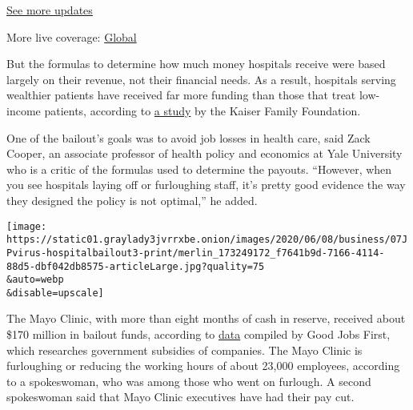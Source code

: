 \href{https://www.nytimes3xbfgragh.onion/live/2020/08/03/business/stock-market-today-coronavirus?action=click\&pgtype=Article\&state=default\&region=MAIN_CONTENT_1\&context=storylines_live_updates}{See
more updates}

More live coverage:
\href{https://www.nytimes3xbfgragh.onion/2020/08/03/world/coronavirus-covid-19.html?action=click\&pgtype=Article\&state=default\&region=MAIN_CONTENT_1\&context=storylines_live_updates}{Global}

But the formulas to determine how much money hospitals receive were
based largely on their revenue, not their financial needs. As a result,
hospitals serving wealthier patients have received far more funding than
those that treat low-income patients, according to
\href{https://www.kff.org/health-costs/issue-brief/distribution-of-cares-act-funding-among-hospitals/?utm_campaign=KFF-2020-Health-Costs\&utm_source=hs_email\&utm_medium=email\&utm_content=87886305\&_hsenc=p2ANqtz--5H_dI5ybM9j7dEUcpNHIhhhSIhGZKuiOyCgdpPdMkmJ65llIkF9D8sYDfor_aNPAh8_2CoURE3ISuaDmzFepJuTo2FQ}{a
study} by the Kaiser Family Foundation.

One of the bailout's goals was to avoid job losses in health care, said
Zack Cooper, an associate professor of health policy and economics at
Yale University who is a critic of the formulas used to determine the
payouts. ``However, when you see hospitals laying off or furloughing
staff, it's pretty good evidence the way they designed the policy is not
optimal,'' he added.

\texttt{[image: https://static01.graylady3jvrrxbe.onion/images/2020/06/08/business/07JPvirus-hospitalbailout3-print/merlin\_173249172\_f7641b9d-7166-4114-88d5-dbf042db8575-articleLarge.jpg?quality=75\\\&auto=webp\\\&disable=upscale]}

The Mayo Clinic, with more than eight months of cash in reserve,
received about \$170 million in bailout funds, according to
\href{https://data.covidstimuluswatch.org/prog.php?agency_sum=\&program_sum=\&parent=mayo-clinic\&major_industry_sum=\&hq_id_sum=\&fedsum=\&company_op=starts\&company=\&agency\%5B\%5D=\&program\%5B\%5D=\&major_industry\%5B\%5D=\&hq_id=\&accountability=\&free_text=\&subsidy_op=\%3E\&subsidy=\&face_loan_op=\%3E\&face_loan=\&subsidy_type\%5B\%5D=\&employees_op=\%3E\&employees=\&state=\&city=}{data}
compiled by Good Jobs First, which researches government subsidies of
companies. The Mayo Clinic is furloughing or reducing the working hours
of about 23,000 employees, according to a spokeswoman, who was among
those who went on furlough. A second spokeswoman said that Mayo Clinic
executives have had their pay cut.


